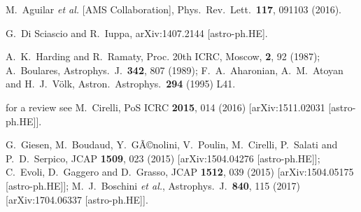\documentclass[prd,aps,twocolumn]{revtex4}
\begin{document}
\begin{thebibliography}{99}
  M.~Aguilar {\it et al.} [AMS Collaboration],
  Phys.\ Rev.\ Lett.\  {\bf 117}, 091103 (2016).



G.~Di Sciascio and R.~Iuppa,
  arXiv:1407.2144 [astro-ph.HE].



 A.~K.~Harding and R.~Ramaty, 
Proc. 20th ICRC, Moscow, {\bf 2}, 92 (1987);
A.~Boulares, 
Astrophys.\ J.\ {\bf 342}, 807 (1989);
F.~A.~Aharonian, A.~M.~Atoyan and H.~J.~V\"olk,
  Astron.\ Astrophys.\  {\bf 294} (1995) L41.

 


for a review see M.~Cirelli,
 PoS ICRC {\bf 2015}, 014 (2016)
  [arXiv:1511.02031 [astro-ph.HE]].

G.~Giesen, M.~Boudaud, Y.~GÃ©nolini, V.~Poulin, M.~Cirelli, P.~Salati and P.~D.~Serpico,
  JCAP {\bf 1509}, 023 (2015)
  [arXiv:1504.04276 [astro-ph.HE]];
C.~Evoli, D.~Gaggero and D.~Grasso,
  JCAP {\bf 1512}, 039 (2015)
  [arXiv:1504.05175 [astro-ph.HE]];
M.~J.~Boschini {\it et al.},
  Astrophys.\ J.\  {\bf 840}, 115 (2017)
  [arXiv:1704.06337 [astro-ph.HE]].




\end{thebibliography}
\end{document}
